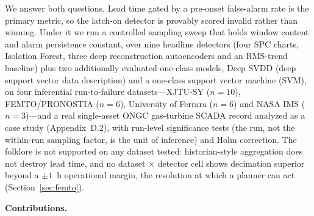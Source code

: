\documentclass[IJPHM, 2026, 0]{PHMSociety}
\makeatletter
\def\PHMslashbreak{\kern\z@\discretionary{}{}{}}
\makeatother
\begin{document}
We answer both questions. Lead time gated by a pre-onset false-alarm rate is the primary metric, so the latch-on detector is provably scored invalid rather than winning. Under it we run a controlled sampling sweep that holds window content and alarm persistence constant, over nine headline detectors (four SPC charts, Isolation Forest, three deep reconstruction autoencoders and an RMS-trend baseline) plus two additionally evaluated one-class models, Deep SVDD (deep support vector data description) and a one-class support vector machine (SVM), on four inferential run-to-failure datasets---XJTU-SY ($n=10$), FEMTO/\PHMslashbreak PRONOSTIA ($n=6$), University of Ferrara ($n=6$) and NASA IMS ($n=3$)---and a real single-asset ONGC gas-turbine SCADA record analyzed as a case study (Appendix~D.2), with run-level significance tests (the run, not the within-run sampling factor, is the unit of inference) and Holm correction. The folklore is not supported on any dataset tested: historian-style aggregation does not destroy lead time, and no dataset $\times$ detector cell shows decimation superior beyond a $\pm 1$~h operational margin, the resolution at which a planner can act (Section~\ref{sec:femto}).

\textbf{Contributions.}
\end{document}
